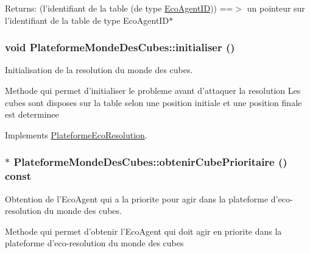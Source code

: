 \begin{Desc}
\item[Returns:](l'identifiant de la table (de type \hyperlink{classEcoAgentID}{EcoAgentID})) ==$>$ un pointeur sur l'identifiant de la table de type EcoAgentID$\ast$ \end{Desc}
\hypertarget{classPlateformeMondeDesCubes_67160be6f5ecd0b8f3fffeb1a7bd81ba}{
\subsubsection[{initialiser}]{\setlength{\rightskip}{0pt plus 5cm}void PlateformeMondeDesCubes::initialiser ()}}
\label{classPlateformeMondeDesCubes_67160be6f5ecd0b8f3fffeb1a7bd81ba}


Initialisation de la resolution du monde des cubes. 

Methode qui permet d'initialiser le probleme avant d'attaquer la resolution Les cubes sont disposes sur la table selon une position initiale et une position finale est determinee 

Implements \hyperlink{classPlateformeEcoResolution_57d87139f09ca51cd6a4fa7cd2e83351}{PlateformeEcoResolution}.\hypertarget{classPlateformeMondeDesCubes_5f3ebe8acdfdbb447c13de8d3cbac438}{
\subsubsection[{obtenirCubePrioritaire}]{ $\ast$ PlateformeMondeDesCubes::obtenirCubePrioritaire () const}}
\label{classPlateformeMondeDesCubes_5f3ebe8acdfdbb447c13de8d3cbac438}


Obtention de l'EcoAgent qui a la priorite pour agir dans la plateforme d'eco-resolution du monde des cubes. 

Methode qui permet d'obtenir l'EcoAgent qui doit agir en priorite dans la plateforme d'eco-resolution du monde des cubes

